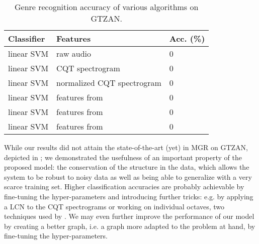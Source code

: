 \begin{table}
	\begin{center}
		\begin{tabular}{|l|l|l|}
			\hline
			Classifier & Features & Acc. (\%) \\
			\hline
			linear SVM & raw audio & 0 \\
			linear SVM & CQT spectrogram & 0 \\
			linear SVM & normalized CQT spectrogram & 0 \\
			linear SVM & features from \eqnref{basispursuit} & 0 \\
			linear SVM & features from \eqnref{minz} & 0 \\
			linear SVM & features from \eqnref{extraction} & 0 \\
			\hline
		\end{tabular}
	\end{center}
	\caption{Genre recognition accuracy of various algorithms on GTZAN.}
	\label{tab:accuracy_comparison}
\end{table}

While our results did not attain the state-of-the-art (yet) in \gls{MGR} on GTZAN, depicted in ;
we demonstrated the usefulness of an important property of the proposed model: the conservation of the structure in the data, which allows the system to be robust to noisy data as well as being able to generalize with a very scarce training set.
Higher classification accuracies are probably achievable by fine-tuning the hyper-parameters and introducing further tricks: e.g. by applying a \gls{LCN} to the \gls{CQT} spectrograms or working on individual octaves, two techniques used by \cite{lecun2011PSDaudio}. We may even further improve the performance of our model by creating a better graph, i.e. a graph more adapted to the problem at hand, by fine-tuning the hyper-parameters.